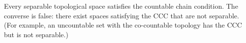 Every separable topological space satisfies the countable chain condition. The converse is false: there exist spaces satisfying the CCC that are not separable. (For example, an uncountable set with the co-countable topology has the CCC but is not separable.)
